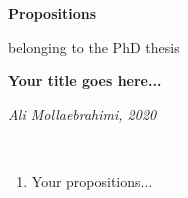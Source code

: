 \centering
\Huge
\textbf{Propositions}
\normalsize

belonging to the PhD thesis

\LARGE
\textbf{Your title goes here...}

\normalsize
\textit{Ali Mollaebrahimi, 2020}

\par
\LARGE
\textcolor{white}{.}

\normalsize
\begin{enumerate}
 \item Your propositions...
\end{enumerate}
